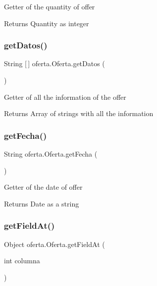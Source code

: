 Getter of the quantity of offer

\begin{DoxyReturn}{Returns}
Quantity as integer 
\end{DoxyReturn}
\mbox{\label{classoferta_1_1_oferta_ab7e97fc4914cdd00e07b36a944170e3b}} 
\subsubsection{\texorpdfstring{get\+Datos()}{getDatos()}}
{\footnotesize\ttfamily String \mbox{[}$\,$\mbox{]} oferta.\+Oferta.\+get\+Datos (\begin{DoxyParamCaption}{ }\end{DoxyParamCaption})}

Getter of all the information of the offer

\begin{DoxyReturn}{Returns}
Array of strings with all the information 
\end{DoxyReturn}
\mbox{\label{classoferta_1_1_oferta_a431cf8c490fc904d8c280f597e343b65}} 
\subsubsection{\texorpdfstring{get\+Fecha()}{getFecha()}}
{\footnotesize\ttfamily String oferta.\+Oferta.\+get\+Fecha (\begin{DoxyParamCaption}{ }\end{DoxyParamCaption})}

Getter of the date of offer

\begin{DoxyReturn}{Returns}
Date as a string 
\end{DoxyReturn}
\mbox{\label{classoferta_1_1_oferta_a9e5faa568e05867cf20972dd64a02838}} 
\subsubsection{\texorpdfstring{get\+Field\+At()}{getFieldAt()}}
{\footnotesize\ttfamily Object oferta.\+Oferta.\+get\+Field\+At (\begin{DoxyParamCaption}\item[{int}]{columna }\end{DoxyParamCaption})}

